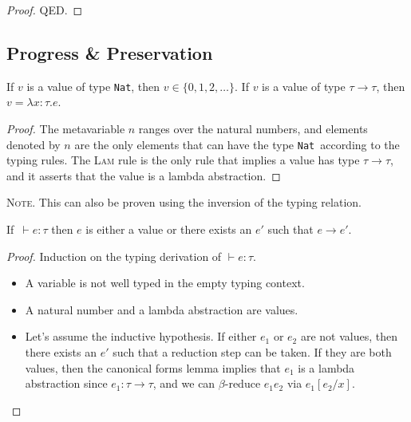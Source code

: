 \documentclass[nonacm]{acmart}
\newcommand{\nat}{\texttt{Nat}}
\begin{document}
\begin{proof}
  {\color{red} QED}.
\end{proof}

\subsection{Progress \& Preservation}

\begin{lemma}
  If $v$ is a value of type \nat, then \(v \in \{0, 1, 2, \dots \} \).
  If $v$ is a value of type \(\tau \rightarrow \tau \), then \(v = \lambda x:\tau.e\).
\end{lemma}

\begin{proof}
  The metavariable \(n\) ranges over the natural numbers, and elements denoted by
  \(n\) are the only elements that can have the type \nat~according to the typing
  rules. The \textsc{Lam} rule is the only rule that implies a value has type \(\tau \rightarrow
  \tau\), and it asserts that the value is a lambda abstraction.
\end{proof}

\textsc{Note}. This can also be proven using the inversion of the typing relation.

\begin{theorem}[Progress]
  If~\(\vdash e : \tau \) then \(e\) is either a value or there exists an \(e'\)
  such that \(e \rightarrow e'\).
\end{theorem}

\begin{proof}
  Induction on the typing derivation of \(\vdash e : \tau \).
  \begin{itemize}
    \item [\textsc{Var.}] A variable is not well typed in the empty typing context.
    \item [\textsc{Nat, Lam.}] A natural number and a lambda abstraction are values.
    \item [\textsc{App.}] Let's assume the inductive hypothesis. If either \(e_1\) or
          \(e_2\) are not values, then there exists an \(e'\) such that a reduction step can
          be taken. If they are both values, then the canonical forms lemma implies that
          \(e_1\) is a lambda abstraction since \(e_1 : \tau \rightarrow \tau \), and we can \(\beta \)-reduce \(e_1 e_2\) via
          \(e_1[e_2/x]\).
  \end{itemize}
\end{proof}
\end{document}
